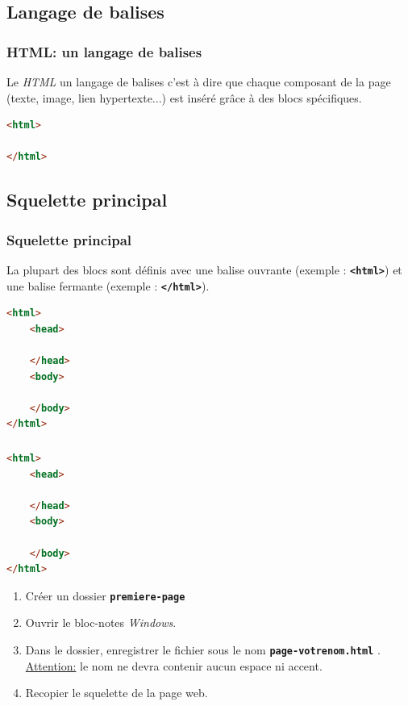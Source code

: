 \documentclass[svgnames,11pt]{beamer}
\begin{document}
\subsection{Langage de balises}
\begin{frame}[fragile]
    \frametitle{HTML: un langage de balises}

    Le \emph{HTML} un langage de balises c’est à dire que chaque composant de la page (texte, image, lien hypertexte...) est inséré grâce à des blocs spécifiques.
    \begin{center}
        \begin{lstlisting}[language=html , basicstyle=\ttfamily\small, xleftmargin=2em, xrightmargin=2em]
<html>

</html>
\end{lstlisting}
        \label{CODE}
    \end{center}
\end{frame}
\subsection{Squelette principal}
\begin{frame}[fragile]
    \frametitle{Squelette principal}

    La plupart des blocs sont définis avec une balise ouvrante (exemple : \texttt{\textbf{<html>}}) et une balise fermante (exemple : \texttt{\textbf{</html>}}).
    \begin{center}
        \begin{lstlisting}[language=html , basicstyle=\ttfamily\small, xleftmargin=2em, xrightmargin=2em]
<html>
    <head>

    </head>
    <body>

    </body>
</html>
\end{lstlisting}
        \label{CODE}
    \end{center}
\end{frame}
\begin{frame}[fragile]
    \frametitle{}
    \begin{lstlisting}[language=html , basicstyle=\ttfamily\small, xleftmargin=2em, xrightmargin=2em]
<html>
    <head>

    </head>
    <body>

    </body>
</html>
\end{lstlisting}
    \begin{activite}
        \begin{enumerate}
            \item Créer un dossier \textbf{\texttt{premiere-page}}
            \item Ouvrir le bloc-notes \emph{Windows}.
            \item Dans le dossier, enregistrer le fichier sous le nom \textbf{\texttt{page-votrenom.html}} . \underline{Attention:} le nom ne devra contenir aucun espace ni accent.
            \item Recopier le squelette de la page web.
        \end{enumerate}
    \end{activite}

\end{frame}
\end{document}

